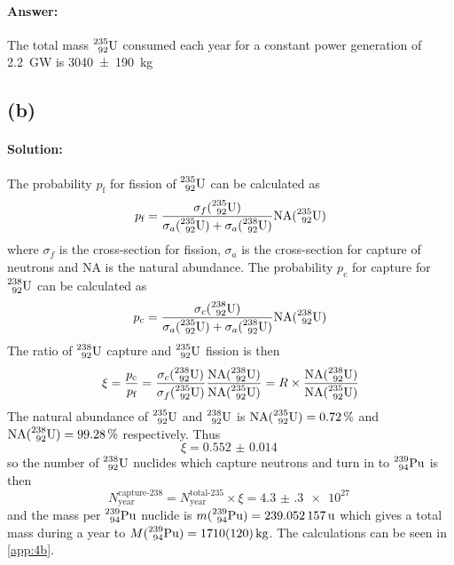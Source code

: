 \paragraph{Answer:} The total mass $\nuc{U}{235}{92}$ consumed each year for a constant power generation of \SI{2.2}{\giga\watt} is \SI{3040(190)}{\kg}


\subsection*{(b)}
\paragraph{Solution:} The probability $p_\textrm{f}$ for fission of $\nuc{U}{235}{92}$ can be calculated as 
\begin{equation}
	p_\textrm{f} = \frac{\sigma_f (\nuc{U}{235}{92})}{\sigma_a (\nuc{U}{235}{92}) + \sigma_a (\nuc{U}{238}{92})} \na(\nuc{U}{235}{92})
\end{equation}
where $\sigma_f$ is the cross-section for fission, $\sigma_a$ is the cross-section for capture of neutrons and NA is the natural abundance. The probability $p_\textrm{c}$ for capture for $\nuc{U}{238}{92}$ can be calculated as
\begin{equation}
	p_\textrm{c} = \frac{\sigma_c (\nuc{U}{238}{92})}{\sigma_a (\nuc{U}{235}{92}) + \sigma_a (\nuc{U}{238}{92})} \na(\nuc{U}{238}{92})
\end{equation}
The ratio of $\nuc{U}{238}{92}$ capture and $\nuc{U}{235}{92}$ fission is then
\begin{equation}
	\xi = \frac{p_\textrm{c}}{p_\textrm{f}} = \frac{\sigma_c (\nuc{U}{238}{92})}{\sigma_f (\nuc{U}{235}{92})} \frac{\na(\nuc{U}{238}{92})}{\na(\nuc{U}{235}{92})} = R \times \frac{\na(\nuc{U}{238}{92})}{\na(\nuc{U}{235}{92})} 
\end{equation}
The natural abundance of $\nuc{U}{235}{92}$ and $\nuc{U}{238}{92}$ is $\na(\nuc{U}{235}{92}) = \SI{0.72}{\percent}$ and $\na(\nuc{U}{238}{92}) = \SI{99.28}{\percent}$ respectively. Thus
\begin{equation}
	\xi = \SI{0.552(14)}{}
\end{equation}
so the number of $\nuc{U}{238}{92}$ nuclides which capture neutrons and turn in to $\nuc{Pu}{239}{94}$ is then
\begin{equation}
	N^\textrm{capture-238}_\textrm{year} = N^\textrm{total-235}_\textrm{year} \times \xi = \SI{4.3(3)e27}{}
\end{equation}
and the mass per $\nuc{Pu}{239}{94}$ nuclide is $m(\nuc{Pu}{239}{94}) = \SI{239.052157}{u}$ which gives a total mass during a year to $M(\nuc{Pu}{239}{94}) = \SI{1710(120)}{\kg}$. The calculations can be seen in \ref{app:4b}.

